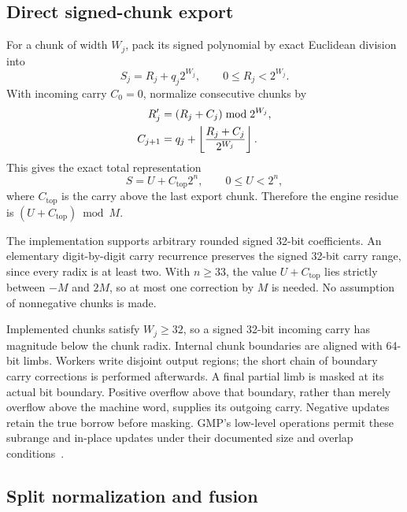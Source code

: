 \documentclass[11pt,a4paper]{article}
\theoremstyle{definition}
\begin{document}
\subsection{Direct signed-chunk export}

For a chunk of width $W_j$, pack its signed polynomial by exact Euclidean
division into
\[
 S_j=R_j+q_j2^{W_j},\qquad 0\le R_j<2^{W_j}.
\]
With incoming carry $C_0=0$, normalize consecutive chunks by
\begin{align}
 R'_j&=(R_j+C_j)\bmod2^{W_j},\label{eq:stitch}\\
 C_{j+1}&=q_j+\left\lfloor\frac{R_j+C_j}{2^{W_j}}\right\rfloor.\notag
\end{align}
This gives the exact total representation
\begin{equation}\label{eq:globalcarry}
S=U+C_{\mathrm{top}}2^n,\qquad 0\le U<2^n,
\end{equation}
where $C_{\mathrm{top}}$ is the carry above the last export chunk.
Therefore the engine residue is $(U+C_{\mathrm{top}})\bmod M$.

The implementation supports arbitrary rounded signed 32-bit coefficients.
An elementary digit-by-digit carry recurrence preserves the signed 32-bit
carry range, since every radix is at least two. With $n\ge33$, the value
$U+C_{\mathrm{top}}$ lies strictly between $-M$ and $2M$, so at most one correction by
$M$ is needed. No assumption of nonnegative chunks is made.

Implemented chunks satisfy $W_j\ge32$, so a signed 32-bit incoming carry
has magnitude below the chunk radix. Internal chunk boundaries are aligned
with 64-bit limbs. Workers write
disjoint output regions; the short chain of boundary carry corrections is
performed afterwards. A final partial limb is masked at its actual bit
boundary. Positive overflow above that boundary, rather than merely overflow
above the machine word, supplies its outgoing carry. Negative updates retain
the true borrow before masking. GMP's low-level operations permit these
subrange and in-place updates under their documented size and overlap
conditions~\cite{gmp}.

\subsection{Split normalization and fusion}
\end{document}
